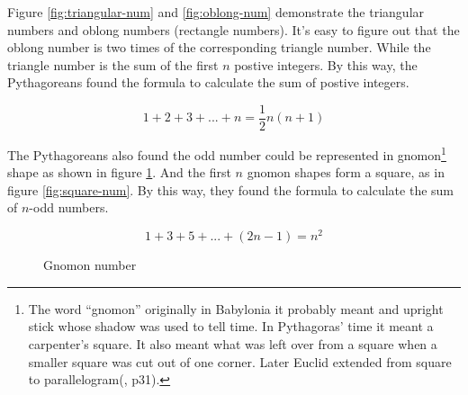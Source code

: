 \documentclass{article}
\begin{document}
Figure \ref{fig:triangular-num} and \ref{fig:oblong-num} demonstrate the triangular numbers and oblong numbers (rectangle numbers). It's easy to figure out that the oblong number is two times of the corresponding triangle number. While the triangle number is the sum of the first $n$ postive integers. By this way, the Pythagoreans found the formula to calculate the sum of postive integers.

\[
1 + 2 + 3 + ... + n = \frac{1}{2}n(n+1)
\]

The Pythagoreans also found the odd number could be represented in gnomon\footnote{The word ``gnomon'' originally in Babylonia it probably meant and upright stick whose shadow was used to tell time. In Pythagoras' time it meant a carpenter's square. It also meant what was left over from a square when a smaller square was cut out of one corner. Later Euclid extended from square to parallelogram(\cite{MKlein1972}, p31).} shape as shown in figure \ref{fig:gnomon-num}. And the first $n$ gnomon shapes form a square, as in figure \ref{fig:square-num}. By this way, they found the formula to calculate the sum of $n$-odd numbers.

\[
1 + 3 + 5 + ... + (2n - 1) = n^2
\]

\begin{figure}[htbp]
\centering
{}
\caption{Gnomon number}
\label{fig:gnomon-num}
\end{figure}
\end{document}

